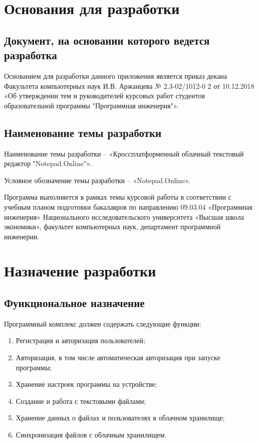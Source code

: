 \section{Основания для разработки}

\subsection{Документ, на основании которого ведется разработка}
Основанием для разработки данного приложения является приказ декана Факультета компьютерных наук И.В. Аржанцева № 2.3-02/1012-0 2 от 10.12.2018 «Об утверждении тем и руководителей курсовых работ студентов образовательной программы "Программная инженерия"».

\subsection{Наименование темы разработки}
Наименование темы разработки – «Кроссплатформенный облачный текстовый редактор "Notepad.Online"».

Условное обозначение темы разработки – «Notepad.Online».

Программа выполняется в рамках темы курсовой работы в соответствии с учебным планом подготовки бакалавров по направлению 09.03.04 «Программная инженерия» Национального исследовательского университета «Высшая школа экономики», факультет компьютерных наук, департамент программной инженерии.

\section{Назначение разработки}

\subsection{Функциональное назначение}
Программный комплекс должен содержать следующие функции:

\begin{enumerate}
\item Регистрация и авторизация пользователей;
\item Авторизация, в том числе автоматическая авторизация при запуске программы;
\item Хранение настроек программы на устройстве;
\item Создание и работа с текстовыми файлами;
\item Хранение данных о файлах и пользователях в облачном хранилище;
\item Синхронизация файлов с облачным хранилищем.
\end{enumerate}

